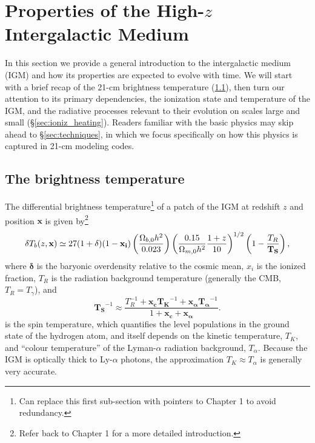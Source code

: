 \section{Properties of the High-$z$ Intergalactic Medium} \label{sec:RT}
In this section we provide a general introduction to the intergalactic medium (IGM) and how its properties are expected to evolve with time. We will start with a brief recap of the 21-cm brightness temperature (\ref{sec:dTb}), then turn our attention to its primary dependencies, the ionization state and temperature of the IGM, and the radiative processes relevant to their evolution on scales large and small (\S\ref{sec:ioniz_heating}). Readers familiar with the basic physics may skip ahead to \S\ref{sec:techniques}, in which we focus specifically on how this physics is captured in 21-cm modeling codes.

\subsection{The brightness temperature} \label{sec:dTb}
The differential brightness temperature\footnote{Can replace this first sub-section with pointers to Chapter 1 to avoid redundancy.} of a patch of the IGM at redshift $z$ and position $\mathbf{x}$ is given by\footnote{Refer back to Chapter 1 for a more detailed introduction.} 
\begin{equation}
    \delta T_b(z, \mathbf{x}) \simeq 27 (1 + \boldmath{\delta}) (1 - \mathbf{x_i}) \left(\frac{\Omega_{b,0} h^2}{0.023} \right) \left(\frac{0.15}{\Omega_{m,0} h^2} \frac{1 + z}{10} \right)^{1/2} \left(1 - \frac{T_R}{\mathbf{T_S}} \right) , \label{eq:dTb}
\end{equation}
where $\mathbf{\delta}$ is the baryonic overdensity relative to the cosmic mean, $x_i$ is the ionized fraction, $T_R$ is the radiation background temperature (generally the CMB, $T_R = T_{\gamma}$), and
\begin{equation}
    \mathbf{T_S}^{-1} \approx \frac{T_R^{-1} + \mathbf{x_c} \mathbf{T_K}^{-1} + \mathbf{x_{\alpha}} \mathbf{T_{\alpha}}^{-1}}{1 + \mathbf{x_c} + \mathbf{x_{\alpha}}} . \label{eq:Ts}
\end{equation}
is the spin temperature, which quantifies the level populations in the ground state of the hydrogen atom, and itself depends on the kinetic temperature, $T_K$, and ``colour temperature'' of the Lyman-$\alpha$ radiation background, $T_{\alpha}$. Because the IGM is optically thick to Ly-$\alpha$ photons, the approximation $T_K \approx T_{\alpha}$ is generally very accurate.

